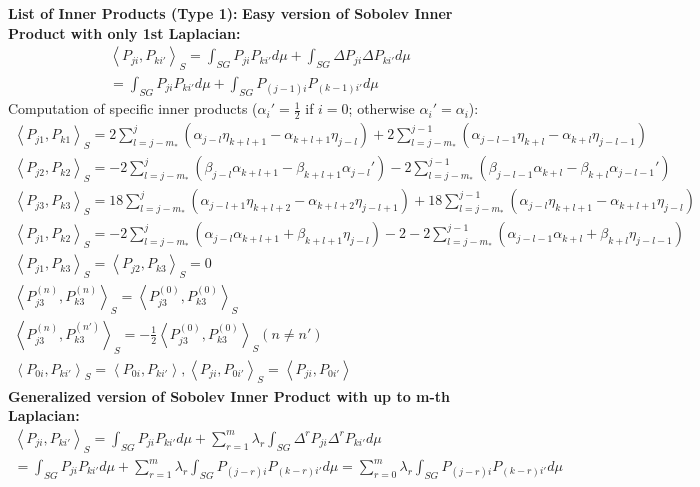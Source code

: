 \documentclass[12pt]{amsart}
\theoremstyle{plain}
\theoremstyle{definition}
\newcommand{\inner}[2]{\left \langle #1, #2\right \rangle}
\newcommand{\lap}{\Delta}
\begin{document}

\textbf{List of Inner Products (Type 1):}
\textbf{Easy version of Sobolev Inner Product with only 1st Laplacian:}
\begin{gather*}
\inner{P_{ji}}{P_{ki'}}_S = \int_{SG} P_{ji}P_{ki'} d \mu  + \int_{SG} \lap P_{ji}\lap P_{ki'} d \mu\\
= \int_{SG} P_{ji}P_{ki'} d \mu  + \int_{SG} P_{(j-1)i} P_{(k-1)i'} d \mu
\end{gather*}
Computation of specific inner products ($\alpha_i'=\frac12$ if $i=0$; otherwise $\alpha_i'=\alpha_i$):
\begin{gather*}
    \inner{P_{j1}}{P_{k1}}_S = 2\sum\limits_{l=j-m_{*}}^{j}\left(\alpha_{j-l}\eta_{k+l+1}-\alpha_{k+l+1}\eta_{j-l}\right) + 2\sum\limits_{l=j-m_{*}}^{j-1}\left(\alpha_{j-l-1}\eta_{k+l}-\alpha_{k+l}\eta_{j-l-1}\right) \\
    \inner{P_{j2}}{P_{k2}}_S = -2\sum\limits_{l=j-m_{*}}^{j}\left(\beta_{j-l}\alpha_{k+l+1}-\beta_{k+l+1}\alpha_{j-l}'\right) - 2\sum\limits_{l=j-m_{*}}^{j-1}\left(\beta_{j-l-1}\alpha_{k+l}-\beta_{k+l}\alpha_{j-l-1}'\right) \\
    \inner{P_{j3}}{P_{k3}}_S = 18\sum\limits_{l=j-m_{*}}^{j}\left(\alpha_{j-l+1}\eta_{k+l+2}-\alpha_{k+l+2}\eta_{j-l+1}\right)+18 \sum\limits_{l=j-m_{*}}^{j-1}\left(\alpha_{j-l}\eta_{k+l+1}-\alpha_{k+l+1}\eta_{j-l}\right) \\
    \inner{P_{j1}}{P_{k2}}_S = -2\sum\limits_{l=j-m_{*}}^{j}\left(\alpha_{j-l}\alpha_{k+l+1}+\beta_{k+l+1}\eta_{j-l}\right)-2
    -2\sum\limits_{l=j-m_{*}}^{j-1}\left(\alpha_{j-l-1}\alpha_{k+l}+\beta_{k+l}\eta_{j-l-1}\right)\\
    \inner{P_{j1}}{P_{k3}}_{S}=\inner{P_{j2}}{P_{k3}}_{S}=0\\
    \inner{P_{j3}^{(n)}}{P_{k3}^{(n)}}_{S}=\inner{P_{j3}^{(0)}}{P_{k3}^{(0)}}_{S}\\
    \inner{P_{j3}^{(n)}}{P_{k3}^{(n')}}_{S}=-\frac{1}{2}\inner{P_{j3}^{(0)}}{P_{k3}^{(0)}}_{S} (n\neq n') \\
    \inner{P_{0i}}{P_{ki'}}_{S}=\inner{P_{0i}}{P_{ki'}}, \inner{P_{ji}}{P_{0i'}}_{S}=\inner{P_{ji}}{P_{0i'}}
\end{gather*}
\textbf{Generalized version of Sobolev Inner Product with up to m-th Laplacian:}
\begin{gather*}
    \inner{P_{ji}}{P_{ki'}}_S = \int_{SG} P_{ji}P_{ki'} d \mu  + \sum\limits_{r=1}^{m}\lambda_{r}\int_{SG} \lap^{r} P_{ji}\lap^{r} P_{ki'} d \mu\\
    = \int_{SG} P_{ji}P_{ki'} d \mu  +\sum\limits_{r=1}^{m} \lambda_{r}\int_{SG} P_{(j-r)i} P_{(k-r)i'} d \mu 
    = \sum\limits_{r=0}^{m} \lambda_{r}\int_{SG} P_{(j-r)i} P_{(k-r)i'} d \mu
\end{gather*}
\end{document}
